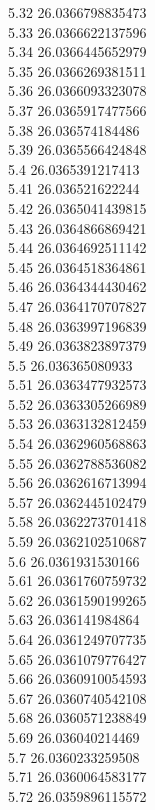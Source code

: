 {5.32	26.0366798835473\\
5.33	26.0366622137596\\
5.34	26.0366445652979\\
5.35	26.0366269381511\\
5.36	26.0366093323078\\
5.37	26.0365917477566\\
5.38	26.036574184486\\
5.39	26.0365566424848\\
5.4	26.0365391217413\\
5.41	26.036521622244\\
5.42	26.0365041439815\\
5.43	26.0364866869421\\
5.44	26.0364692511142\\
5.45	26.0364518364861\\
5.46	26.0364344430462\\
5.47	26.0364170707827\\
5.48	26.0363997196839\\
5.49	26.0363823897379\\
5.5	26.036365080933\\
5.51	26.0363477932573\\
5.52	26.0363305266989\\
5.53	26.0363132812459\\
5.54	26.0362960568863\\
5.55	26.0362788536082\\
5.56	26.0362616713994\\
5.57	26.0362445102479\\
5.58	26.0362273701418\\
5.59	26.0362102510687\\
5.6	26.0361931530166\\
5.61	26.0361760759732\\
5.62	26.0361590199265\\
5.63	26.036141984864\\
5.64	26.0361249707735\\
5.65	26.0361079776427\\
5.66	26.0360910054593\\
5.67	26.0360740542108\\
5.68	26.0360571238849\\
5.69	26.036040214469\\
5.7	26.0360233259508\\
5.71	26.0360064583177\\
5.72	26.0359896115572\\
}

